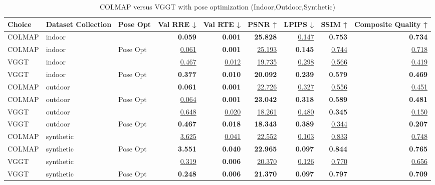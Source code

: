 \begin{table}[H]
\caption{\ifdefined\customcaption \customcaption \else COLMAP versus VGGT with pose optimization (Indoor,Outdoor,Synthetic) \fi}
\label{tab:04_pose_opt_indoor,outdoor,synthetic}
\centering
\scriptsize
\begin{tabular}{lllrrrrrr}
\toprule
Choice & Dataset Collection & Pose Opt & Val RRE ↓ & Val RTE ↓ & PSNR ↑ & LPIPS ↓ & SSIM ↑ & Composite Quality ↑ \\
\midrule
COLMAP & indoor &  & \textbf{0.059} & \textbf{0.001} & \textbf{25.828} & \underline{0.147} & \textbf{0.753} & \textbf{0.734} \\
COLMAP & indoor & Pose Opt & \underline{0.061} & \textbf{0.001} & \underline{25.193} & \textbf{0.145} & \underline{0.744} & \underline{0.718} \\
\midrule
VGGT & indoor &  & \underline{0.467} & \underline{0.012} & \underline{19.735} & \underline{0.298} & \underline{0.566} & \underline{0.419} \\
VGGT & indoor & Pose Opt & \textbf{0.377} & \textbf{0.010} & \textbf{20.092} & \textbf{0.239} & \textbf{0.579} & \textbf{0.469} \\
\midrule
COLMAP & outdoor &  & \textbf{0.061} & \textbf{0.001} & \underline{22.726} & \underline{0.327} & \underline{0.556} & \underline{0.451} \\
COLMAP & outdoor & Pose Opt & \underline{0.064} & \textbf{0.001} & \textbf{23.042} & \textbf{0.318} & \textbf{0.589} & \textbf{0.481} \\
\midrule
VGGT & outdoor &  & \underline{0.648} & \underline{0.020} & \underline{18.261} & \underline{0.480} & \textbf{0.345} & \underline{0.150} \\
VGGT & outdoor & Pose Opt & \textbf{0.467} & \textbf{0.018} & \textbf{18.343} & \textbf{0.389} & \underline{0.344} & \textbf{0.207} \\
\midrule
COLMAP & synthetic &  & \underline{3.625} & \underline{0.041} & \underline{22.552} & \underline{0.103} & \underline{0.833} & \underline{0.748} \\
COLMAP & synthetic & Pose Opt & \textbf{3.551} & \textbf{0.040} & \textbf{22.965} & \textbf{0.097} & \textbf{0.844} & \textbf{0.765} \\
\midrule
VGGT & synthetic &  & \underline{0.319} & \textbf{0.006} & \underline{20.370} & \underline{0.126} & \underline{0.770} & \underline{0.656} \\
VGGT & synthetic & Pose Opt & \textbf{0.248} & \textbf{0.006} & \textbf{21.370} & \textbf{0.097} & \textbf{0.797} & \textbf{0.709} \\
\bottomrule
\end{tabular}
\end{table}